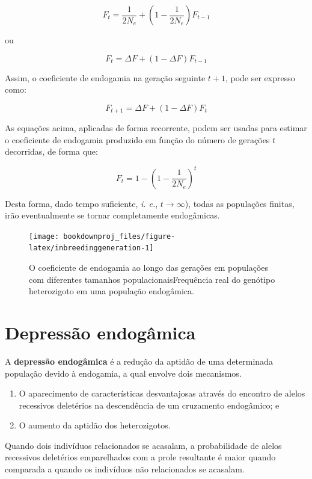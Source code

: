 \documentclass[
]{book}
\begin{document}
\[F_t = \frac{1}{2N_e} + \left( 1- \frac{1}{2N_e} \right)F_{t-1}\]

ou

\[F_t = \Delta F + \left( 1- \Delta F \right)F_{t-1}\]

Assim, o coeficiente de endogamia na geração seguinte \(t+1\), pode ser expresso como:

\[F_{t+1} = \Delta F + \left( 1- \Delta F \right)F_{t}\]

As equações acima, aplicadas de forma recorrente, podem ser usadas para estimar o coeficiente de endogamia produzido em função do número de gerações \(t\) decorridas, de forma que:

\[F_t = 1 - \left( 1- \frac{1}{2N_e} \right)^t\]

Desta forma, dado tempo suficiente, \emph{i. e.}, \(t \rightarrow \infty\)), todas as populações finitas, irão eventualmente se tornar completamente endogâmicas.

\begin{figure}

{\centering \texttt{[image: bookdownproj\_files/figure-latex/inbreedinggeneration-1]} 

}

\caption{O coeficiente de endogamia ao longo das gerações em populações com diferentes tamanhos populacionaisFrequência real do genótipo heterozigoto em uma população endogâmica.}\label{fig:inbreedinggeneration}
\end{figure}

\hypertarget{depressuxe3o-endoguxe2mica}{%
\section{Depressão endogâmica}\label{depressuxe3o-endoguxe2mica}}

A \textbf{depressão endogâmica} é a redução da aptidão de uma determinada população devido à endogamia, a qual envolve dois mecanismos.

\begin{enumerate}
\def\labelenumi{\arabic{enumi}.}
\item
  O aparecimento de características desvantajosas através do encontro de alelos recessivos deletérios na descendência de um cruzamento endogâmico; e
\item
  O aumento da aptidão dos heterozigotos.
\end{enumerate}

Quando dois indivíduos relacionados se acasalam, a probabilidade de alelos recessivos deletérios emparelhados com a prole resultante é maior quando comparada a quando os indivíduos não relacionados se acasalam.
\end{document}
